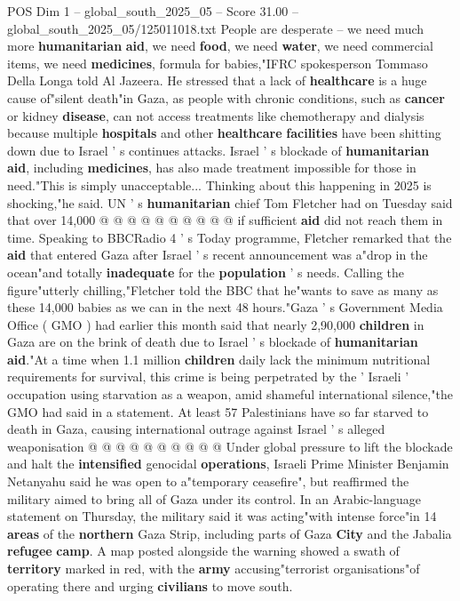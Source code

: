 \begin{textsample}{POS Dim 1 – global\_south\_2025\_05 – Score 31.00 – global\_south\_2025\_05/125011018.txt}
People are desperate -- we need much more \textbf{humanitarian} \textbf{aid}, we need \textbf{food}, we need \textbf{water}, we need commercial items, we need \textbf{medicines}, formula for babies,"IFRC spokesperson Tommaso Della Longa told Al Jazeera.
He stressed that a lack of \textbf{healthcare} is a huge cause of"silent death"in Gaza, as people with chronic conditions, such as \textbf{cancer} or kidney \textbf{disease}, can not access treatments like chemotherapy and dialysis because multiple \textbf{hospitals} and other \textbf{healthcare} \textbf{facilities} have been shitting down due to Israel ' s continues attacks.
Israel ' s blockade of \textbf{humanitarian} \textbf{aid}, including \textbf{medicines}, has also made treatment impossible for those in need."This is simply unacceptable...
Thinking about this happening in 2025 is shocking,"he said.
UN ' s \textbf{humanitarian} chief Tom Fletcher had on Tuesday said that over 14,000 @ @ @ @ @ @ @ @ @ @ if sufficient \textbf{aid} did not reach them in time.
Speaking to BBCRadio 4 ' s Today programme, Fletcher remarked that the \textbf{aid} that entered Gaza after Israel ' s recent announcement was a"drop in the ocean"and totally \textbf{inadequate} for the \textbf{population} ' s needs.
Calling the figure"utterly chilling,"Fletcher told the BBC that he"wants to save as many as these 14,000 babies as we can in the next 48 hours."Gaza ' s Government Media Office ( GMO ) had earlier this month said that nearly 2,90,000 \textbf{children} in Gaza are on the brink of death due to Israel ' s blockade of \textbf{humanitarian} \textbf{aid}."At a time when 1.1 million \textbf{children} daily lack the minimum nutritional requirements for survival, this crime is being perpetrated by the ' Israeli ' occupation using starvation as a weapon, amid shameful international silence,"the GMO had said in a statement.
At least 57 Palestinians have so far starved to death in Gaza, causing international outrage against Israel ' s alleged weaponisation @ @ @ @ @ @ @ @ @ @ Under global pressure to lift the blockade and halt the \textbf{intensified} genocidal \textbf{operations}, Israeli Prime Minister Benjamin Netanyahu said he was open to a"temporary ceasefire", but reaffirmed the military aimed to bring all of Gaza under its control.
In an Arabic-language statement on Thursday, the military said it was acting"with intense force"in 14 \textbf{areas} of the \textbf{northern} Gaza Strip, including parts of Gaza \textbf{City} and the Jabalia \textbf{refugee} \textbf{camp}.
A map posted alongside the warning showed a swath of \textbf{territory} marked in red, with the \textbf{army} accusing"terrorist organisations"of operating there and urging \textbf{civilians} to move south.

\end{textsample}

